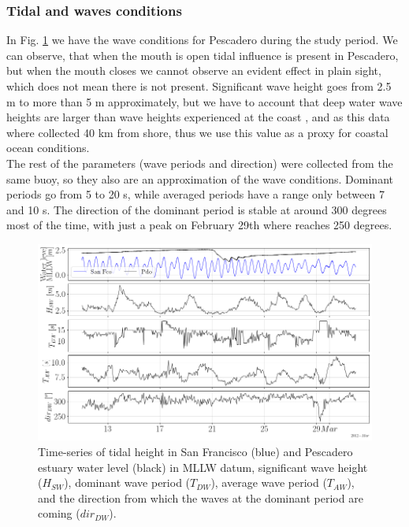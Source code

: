 \documentclass[tesis.tex]{subfiles}
\begin{document}
\subsubsection{Tidal and waves conditions}

In Fig. \ref{fig:wave1} we have the wave conditions for Pescadero during the study period. We can observe, that when the mouth is open tidal influence is present in Pescadero, but when the mouth closes we cannot observe an evident effect in plain sight, which does not mean there is not present. Significant wave height goes from 2.5 m to more than 5 m approximately, but we have to account that deep water wave heights are larger than wave heights experienced at the coast \citep{Williams2014}, and as this data where collected 40 km from shore, thus we use this value as a proxy for coastal ocean conditions.  \\

The rest of the parameters (wave periods and direction) were collected from the same buoy, so they also are an approximation of the wave conditions. Dominant periods go from 5 to 20 s, while averaged periods have a range only between 7 and 10 s. The direction of the dominant period is stable at around 300 degrees most of the time, with just a peak on February 29th where reaches 250 degrees.\\

\begin{figure}[h!]
    \centering
    \includegraphics[width=\textwidth]{Imagenes/wave1.png}
    \caption{Time-series of tidal height in San Francisco (blue) and Pescadero estuary water level (black) in MLLW datum, significant wave height ($H_{SW}$), dominant wave period ($T_{DW}$), average wave period ($T_{AW}$), and the direction from which the waves at the dominant period are coming ($dir_{DW}$).}
    \label{fig:wave1}
\end{figure}
\end{document}
